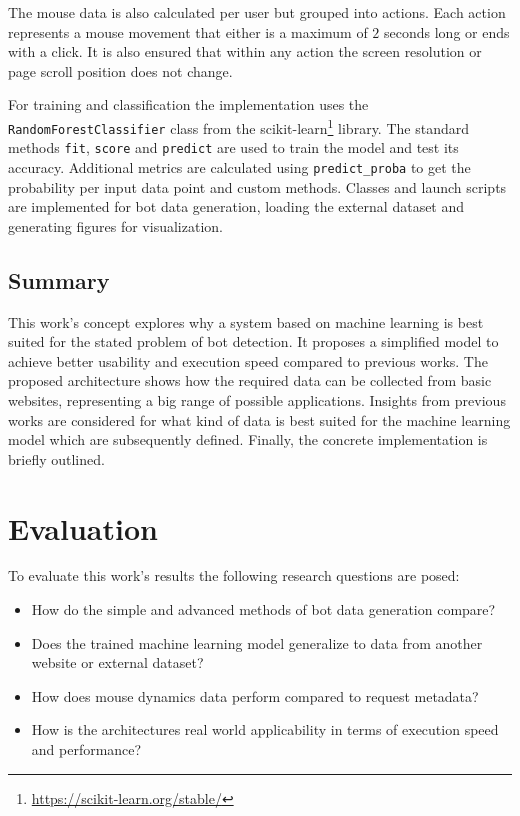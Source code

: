 \documentclass[
    fontsize=12pt,
    headings=small,
    parskip=half,           %
    bibliography=totoc,
    numbers=noenddot,       %
    open=any,               %
    final,                   %
    table
]{scrreprt}
\begin{document}
The mouse data is also calculated per user but grouped into actions. Each action represents a mouse movement that either is a maximum of $2$ seconds long or ends with a click. It is also ensured that within any action the screen resolution or page scroll position does not change.

For training and classification the implementation uses the \lstinline{RandomForestClassifier} class from the scikit-learn\footnote{\url{https://scikit-learn.org/stable/}} library. The standard methods \lstinline{fit}, \lstinline{score} and \lstinline{predict} are used to train the model and test its accuracy. Additional metrics are calculated using \lstinline{predict_proba} to get the probability per input data point and custom methods. Classes and launch scripts are implemented for bot data generation, loading the external dataset and generating figures for visualization.


\section{Summary}

This work's concept explores why a system based on machine learning is best suited for the stated problem of bot detection. It proposes a simplified model to achieve better usability and execution speed compared to previous works. The proposed architecture shows how the required data can be collected from basic websites, representing a big range of possible applications. Insights from previous works are considered for what kind of data is best suited for the machine learning model which are subsequently defined. Finally, the concrete implementation is briefly outlined.


\label{sec:eval}
\chapter{Evaluation}

To evaluate this work's results the following research questions are posed:

\begin{itemize}
    \item How do the simple and advanced methods of bot data generation compare?
    \item Does the trained machine learning model generalize to data from another website or external dataset?
    \item How does mouse dynamics data perform compared to request metadata?
    \item How is the architectures real world applicability in terms of execution speed and performance?

\end{itemize}
\end{document}
